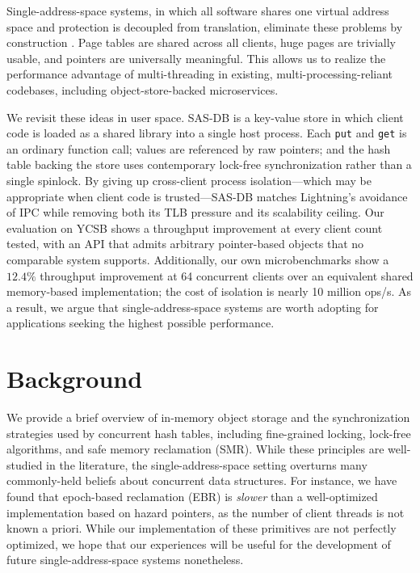 Single-address-space systems, in which all software shares one virtual address
space and protection is decoupled from translation, eliminate these problems by
construction \cite{chase94opal, hunt07singularity}. Page tables are shared
across all clients, huge pages are trivially usable, and pointers are
universally meaningful. This allows us to realize the performance advantage of
multi-threading in existing, multi-processing-reliant codebases, including
object-store-backed microservices.

We revisit these ideas in user space. SAS-DB is a key-value store in which
client code is loaded as a shared library into a single host process. Each
\texttt{put} and \texttt{get} is an ordinary function call; values are
referenced by raw pointers; and the hash table backing the store uses
contemporary lock-free synchronization rather than a single spinlock. By giving
up cross-client process isolation---which may be appropriate when client code is
trusted---SAS-DB matches Lightning's avoidance of IPC while removing both its
TLB pressure and its scalability ceiling. Our evaluation on YCSB shows a
throughput improvement at every client count tested, with an API that admits
arbitrary pointer-based objects that no comparable system supports.
Additionally, our own microbenchmarks show a $12.4\%$ throughput improvement at
64 concurrent clients over an equivalent shared memory-based implementation; the
cost of isolation is nearly 10 million ops/s. As a result, we argue that
single-address-space systems are worth adopting for applications seeking the
highest possible performance.

\section{Background}

We provide a brief overview of in-memory object storage and the synchronization
strategies used by concurrent hash tables, including fine-grained locking,
lock-free algorithms, and safe memory reclamation (SMR). While these principles
are well-studied in the literature, the single-address-space setting overturns
many commonly-held beliefs about concurrent data structures. For instance, we
have found that epoch-based reclamation (EBR) is \emph{slower} than a
well-optimized implementation based on hazard pointers, as the number of client
threads is not known a priori. While our implementation of these primitives are
not perfectly optimized, we hope that our experiences will be useful for the
development of future single-address-space systems nonetheless.

